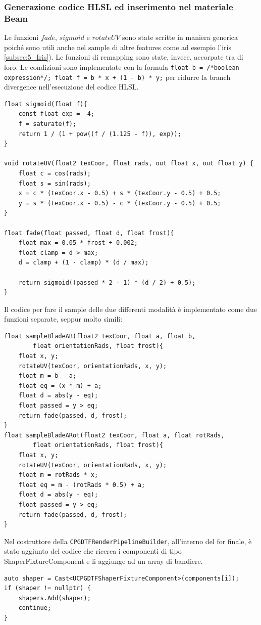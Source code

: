 \documentclass[main.tex]{subfiles}
\begin{document}
\subsubsection{Generazione codice HLSL ed inserimento nel materiale Beam}\label{subsec:5_1_ShaperHlsl}
\lstset{language=glsl}
Le funzioni $fade$, $sigmoid$ e $rotateUV$ sono state scritte in maniera generica poiché sono utili anche nel sample di altre features come ad esempio l'iris \ref{subsec:5_Iris}). Le funzioni di remapping sono state, invece, accorpate tra di loro. Le condizioni sono implementate con la formula \lstinline{float b = /*boolean expression*/; float f = b * x + (1 - b) * y;} per ridurre la branch divergence nell'esecuzione del codice HLSL.
\begin{lstlisting}
float sigmoid(float f){
	const float exp = -4;
	f = saturate(f);
	return 1 / (1 + pow((f / (1.125 - f)), exp));
}

void rotateUV(float2 texCoor, float rads, out float x, out float y) {
	float c = cos(rads);
	float s = sin(rads);
	x = c * (texCoor.x - 0.5) + s * (texCoor.y - 0.5) + 0.5;
	y = s * (texCoor.x - 0.5) - c * (texCoor.y - 0.5) + 0.5;
}

float fade(float passed, float d, float frost){
	float max = 0.05 * frost + 0.002;
	float clamp = d > max;
	d = clamp + (1 - clamp) * (d / max);

	return sigmoid((passed * 2 - 1) * (d / 2) + 0.5);
}
\end{lstlisting}

Il codice per fare il sample delle due differenti modalità è implementato come due funzioni separate, seppur molto simili:
\begin{lstlisting}
float sampleBladeAB(float2 texCoor, float a, float b,
		float orientationRads, float frost){
	float x, y;
	rotateUV(texCoor, orientationRads, x, y);
	float m = b - a;
	float eq = (x * m) + a;
	float d = abs(y - eq);
	float passed = y > eq;
	return fade(passed, d, frost);
}
float sampleBladeARot(float2 texCoor, float a, float rotRads,
		float orientationRads, float frost){
	float x, y;
	rotateUV(texCoor, orientationRads, x, y);
	float m = rotRads * x;
	float eq = m - (rotRads * 0.5) + a;
	float d = abs(y - eq);
	float passed = y > eq;
	return fade(passed, d, frost);
}
\end{lstlisting}


Nel costruttore della \lstinline{CPGDTFRenderPipelineBuilder}, all'interno del for finale, è stato aggiunto del codice che ricerca i componenti di tipo ShaperFixtureComponent e li aggiunge ad un array di bandiere.
\lstset{language=UEcpp}
\begin{lstlisting}
auto shaper = Cast<UCPGDTFShaperFixtureComponent>(components[i]);
if (shaper != nullptr) {
    shapers.Add(shaper);
    continue;
}
\end{lstlisting}
\end{document}
